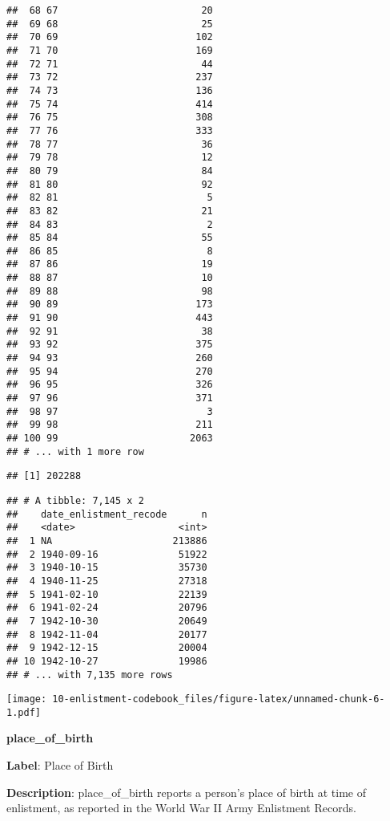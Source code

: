 \documentclass[
]{article}
\begin{document}
\begin{verbatim}
##  68 67                         20
##  69 68                         25
##  70 69                        102
##  71 70                        169
##  72 71                         44
##  73 72                        237
##  74 73                        136
##  75 74                        414
##  76 75                        308
##  77 76                        333
##  78 77                         36
##  79 78                         12
##  80 79                         84
##  81 80                         92
##  82 81                          5
##  83 82                         21
##  84 83                          2
##  85 84                         55
##  86 85                          8
##  87 86                         19
##  88 87                         10
##  89 88                         98
##  90 89                        173
##  91 90                        443
##  92 91                         38
##  93 92                        375
##  94 93                        260
##  95 94                        270
##  96 95                        326
##  97 96                        371
##  98 97                          3
##  99 98                        211
## 100 99                       2063
## # ... with 1 more row
\end{verbatim}

\begin{verbatim}
## [1] 202288
\end{verbatim}

\begin{verbatim}
## # A tibble: 7,145 x 2
##    date_enlistment_recode      n
##    <date>                  <int>
##  1 NA                     213886
##  2 1940-09-16              51922
##  3 1940-10-15              35730
##  4 1940-11-25              27318
##  5 1941-02-10              22139
##  6 1941-02-24              20796
##  7 1942-10-30              20649
##  8 1942-11-04              20177
##  9 1942-12-15              20004
## 10 1942-10-27              19986
## # ... with 7,135 more rows
\end{verbatim}

\texttt{[image: 10-enlistment-codebook\_files/figure-latex/unnamed-chunk-6-1.pdf]}
\vspace{30pt}

\newpage

\textbf{\huge place\_of\_birth } \normalsize \vspace{12pt}

\textbf{Label}: Place of Birth

\textbf{Description}: place\_of\_birth reports a person's place of birth
at time of enlistment, as reported in the World War II Army Enlistment
Records.
\end{document}
